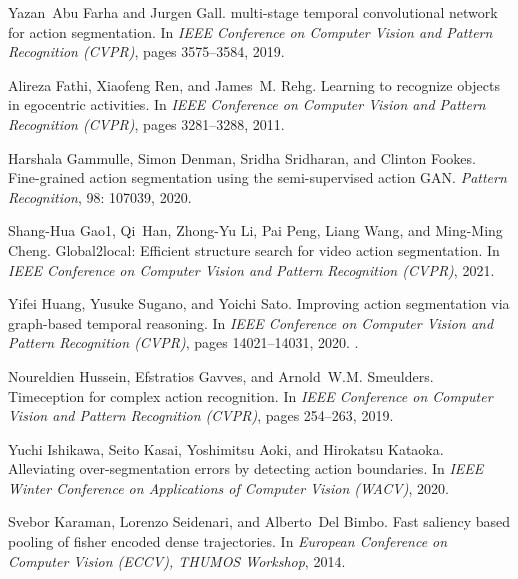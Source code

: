 \documentclass{bmvc2k}
\begin{document}
\begin{thebibliography}{53}
Yazan~Abu Farha and Jurgen Gall.
 multi-stage temporal convolutional network for action
  segmentation.
\newblock In \emph{{IEEE} Conference on Computer Vision and Pattern Recognition
  (CVPR)}, pages 3575--3584, 2019.

Alireza Fathi, Xiaofeng Ren, and James~M. Rehg.
\newblock Learning to recognize objects in egocentric activities.
\newblock In \emph{{IEEE} Conference on Computer Vision and Pattern Recognition
  (CVPR)}, pages 3281--3288, 2011.

Harshala Gammulle, Simon Denman, Sridha Sridharan, and Clinton Fookes.
\newblock Fine-grained action segmentation using the semi-supervised action
  {GAN}.
\newblock \emph{Pattern Recognition}, 98: 107039, 2020.

Shang-Hua Gao1, Qi~Han, Zhong-Yu Li, Pai Peng, Liang Wang, and Ming-Ming Cheng.
\newblock Global2local: Efficient structure search for video action
  segmentation.
\newblock In \emph{IEEE Conference on Computer Vision and Pattern Recognition
  (CVPR)}, 2021.

Yifei Huang, Yusuke Sugano, and Yoichi Sato.
\newblock Improving action segmentation via graph-based temporal reasoning.
\newblock In \emph{IEEE Conference on Computer Vision and Pattern Recognition
  (CVPR)}, pages 14021--14031, 2020.
\newblock {}.

Noureldien Hussein, Efstratios Gavves, and Arnold~W.M. Smeulders.
\newblock Timeception for complex action recognition.
\newblock In \emph{{IEEE} Conference on Computer Vision and Pattern Recognition
  (CVPR)}, pages 254--263, 2019.

Yuchi Ishikawa, Seito Kasai, Yoshimitsu Aoki, and Hirokatsu Kataoka.
\newblock Alleviating over-segmentation errors by detecting action boundaries.
\newblock In \emph{IEEE Winter Conference on Applications of Computer Vision
  (WACV)}, 2020.

Svebor Karaman, Lorenzo Seidenari, and Alberto~Del Bimbo.
\newblock Fast saliency based pooling of fisher encoded dense trajectories.
\newblock In \emph{European Conference on Computer Vision (ECCV), THUMOS
  Workshop}, 2014.


\end{thebibliography}
\end{document}

